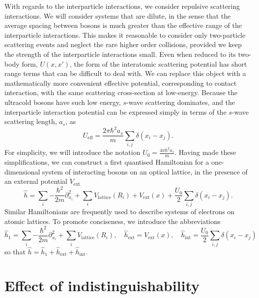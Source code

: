 \documentclass[a4paper, 10pt]{article}
\theoremstyle{plain}
\begin{document}
With regards to the interparticle interactions, we consider repulsive scattering
interactions. We will consider systems that are dilute, in the sense that the
average spacing between bosons is much greater than the effective range of the
interparticle interactions. This makes it reasonable to consider only
two-particle scattering events and neglect the rare higher order collisions,
provided we keep the strength of the interparticle interactions small. Even when
reduced to its two-body form, $U(x,x')$, the form of the interatomic scattering
potential has short range terms that can be difficult to deal with. We can
replace this object with a mathematically more convenient effective potential,
corresponding to contact interaction, with the same scattering cross-section at
low-energy. Because the ultracold bosons have such low energy, $s$-wave
scattering dominates, and the interparticle interaction potential can be
expressed simply in terms of the $s$-wave scattering length, $a_{s}$, as
\begin{equation}
    U_{\text{eff}}
    =
    \frac{2 \pi\hbar^{2} a_{s}}{m}
    \sum_{i,j}{\delta(x_{i} - x_{j})}.
\end{equation}
For simplicity, we will introduce the notation $U_{0} = \frac{4 \pi \hbar^{2}
a_{s}}{m}$. Having made these simplifications, we can construct a first
quantised Hamiltonian for a one-dimensional system of interacting bosons on an
optical lattice, in the presence of an external potential $V_{\text{ext}}$
\begin{equation}
    \label{eq:HamiltonianCoordinateRepresentation}
    \hat{h}
    =
    \sum_{i}{-\frac{\hbar^{2}}{2m}  \partial_{x_{i}}^{2}} +
    \sum_{i}{V_{\text{lattice}}(R_{i})} +
    V_{\text{ext}}(x) +
    \frac{U_{0}}{2} \sum_{i,j}{\delta(x_{i} - x_{j})}.
\end{equation}
Similar Hamiltonians are frequently used to describe systems of electrons on
atomic lattices. To promote conciseness, we introduce the abbreviations
\begin{equation*}
    \hat{h}_{1}
    =
    \sum_{i}{-\frac{\hbar^{2}}{2m} \partial_{x_{i}}^{2}} +
    \sum_{i}{V_{\text{lattice}}(R_{i})},
    \quad
    \hat{h}_{\text{ext}}
    =
    V_{\text{ext}}(x),
    \quad
    \hat{h}_{\text{int}}
    =
    \frac{U_{0}}{2} \sum_{i,j}\delta{(x_{i}-x_{j})}
\end{equation*}
so that $\hat{h}=\hat{h}_1+\hat{h}_{\text{ext}}+\hat{h}_{\text{int}}$.


\section{Effect of indistinguishability}
\end{document}
